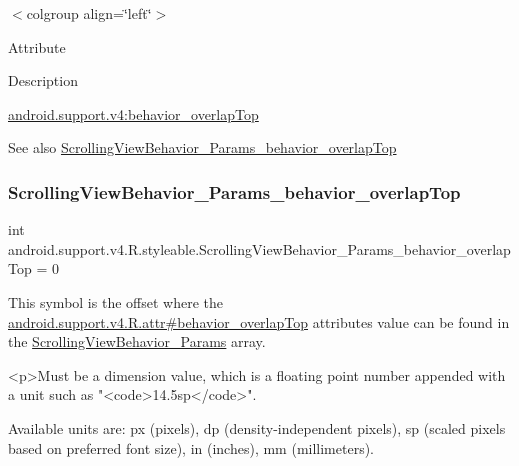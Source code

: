 \tabulinesep=1mm
\begin{longtabu} spread 0pt [c]{*{0}{|X[-1]}|}
\hline
\end{longtabu}
$<$colgroup align=\char`\"{}left\char`\"{}$>$ 

Attribute

Description 

{\ttfamily \hyperlink{classandroid_1_1support_1_1v4_1_1R_1_1styleable_aa15db50a988307d32a8d9f28a43f14aa}{android.\+support.\+v4\+:behavior\+\_\+overlap\+Top}}

\begin{DoxySeeAlso}{See also}
\hyperlink{classandroid_1_1support_1_1v4_1_1R_1_1styleable_aa15db50a988307d32a8d9f28a43f14aa}{Scrolling\+View\+Behavior\+\_\+\+Params\+\_\+behavior\+\_\+overlap\+Top} 
\end{DoxySeeAlso}
\mbox{\label{classandroid_1_1support_1_1v4_1_1R_1_1styleable_aa15db50a988307d32a8d9f28a43f14aa}} 
\subsubsection{\texorpdfstring{Scrolling\+View\+Behavior\+\_\+\+Params\+\_\+behavior\+\_\+overlap\+Top}{ScrollingViewBehavior\_Params\_behavior\_overlapTop}}
{\footnotesize\ttfamily int android.\+support.\+v4.\+R.\+styleable.\+Scrolling\+View\+Behavior\+\_\+\+Params\+\_\+behavior\+\_\+overlap\+Top = 0\hspace{0.3cm}{\ttfamily [static]}}

This symbol is the offset where the \hyperlink{classandroid_1_1support_1_1v4_1_1R_1_1attr_a9c99f83bd4153ed9af5740d4a4cf48dc}{android.\+support.\+v4.\+R.\+attr\#behavior\+\_\+overlap\+Top} attribute\textquotesingle{}s value can be found in the \hyperlink{classandroid_1_1support_1_1v4_1_1R_1_1styleable_a6d0733db2ccefc6d9526c8cfa4b29ea2}{Scrolling\+View\+Behavior\+\_\+\+Params} array.

\begin{DoxyVerb}      <p>Must be a dimension value, which is a floating point number appended with a unit such as "<code>14.5sp</code>".
\end{DoxyVerb}
 Available units are\+: px (pixels), dp (density-\/independent pixels), sp (scaled pixels based on preferred font size), in (inches), mm (millimeters). 


